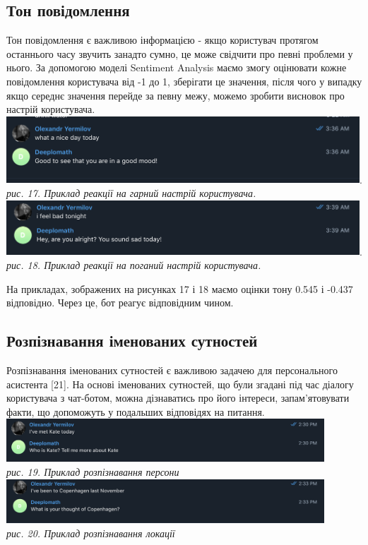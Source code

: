\subsection{Тон повідомлення}
Тон повідомлення є важливою інформацією - якщо користувач протягом останнього часу звучить занадто сумно, це може свідчити про певні проблеми у нього. За допомогою моделі Sentiment Analysis маємо змогу оцінювати кожне повідомлення користувача від -1 до 1, зберігати це значення, після чого у випадку якщо середнє значення перейде за певну межу, можемо зробити висновок про настрій користувача.\\
\includegraphics[width=500]{Dissertation/good_sent.png}.\\
\textit{рис. 17. Приклад реакції на гарний настрій користувача.}\\
\includegraphics[width=500]{Dissertation/bad_sent.png}.\\
\textit{рис. 18. Приклад реакції на поганий настрій користувача.}

На прикладах, зображених на рисунках 17 і 18 маємо оцінки тону 0.545 і -0.437 відповідно. Через це, бот реагує відповідним чином.

\subsection{Розпізнавання іменованих сутностей}
Розпізнавання іменованих сутностей є важливою задачею для персонального асистента [21]. На основі іменованих сутностей, що були згадані під час діалогу користувача з чат-ботом, можна дізнаватись про його інтереси, запам'ятовувати факти, що допоможуть у подальших відповідях на питання. \\
\includegraphics[width = 450]{Dissertation/ner_1.png}\\
\textit{рис. 19. Приклад розпізнавання персони}\\
\includegraphics[width = 450]{Dissertation/ner_2.png}\\
\textit{рис. 20. Приклад розпізнавання локації}\\

